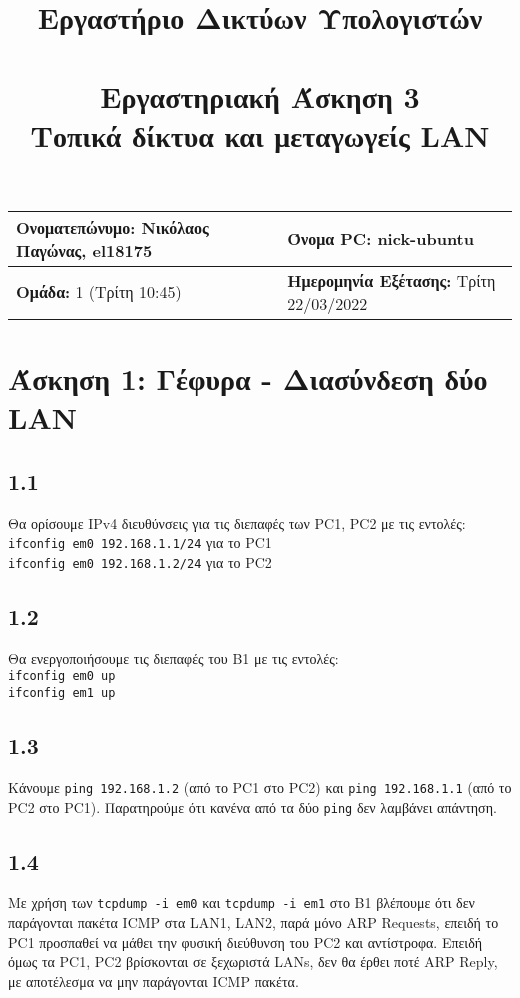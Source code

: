 \documentclass[a4paper, 12pt]{article}
\title{
	\textbf{Εργαστήριο Δικτύων Υπολογιστών} \\~\\
	Εργαστηριακή Άσκηση 3 \\ 
	Τοπικά δίκτυα και μεταγωγείς LAN
}
\author{}
\date{}
\begin{document}
\maketitle
\begin{center}
	\begin{tabular}{|l|l|}
		\hline
		\textbf{Ονοματεπώνυμο:} Νικόλαος Παγώνας, el18175  & \textbf{Όνομα PC:} nick-ubuntu \\
		\hline
		\textbf{Ομάδα:} 1 (Τρίτη 10:45) & \textbf{Ημερομηνία Εξέτασης:} Τρίτη 22/03/2022 \\
		\hline
	\end{tabular}
\end{center}

\section*{Άσκηση 1: Γέφυρα - Διασύνδεση δύο LAN}
	
	\subsection*{1.1}
		Θα ορίσουμε IPv4 διευθύνσεις για τις διεπαφές των PC1, PC2 με τις εντολές: \\
		\verb|ifconfig em0 192.168.1.1/24| για το PC1 \\
		\verb|ifconfig em0 192.168.1.2/24| για το PC2 
	
	\subsection*{1.2}
		Θα ενεργοποιήσουμε τις διεπαφές του Β1 με τις εντολές: \\
		\verb|ifconfig em0 up| \\
		\verb|ifconfig em1 up|
	
	\subsection*{1.3}
		Κάνουμε \verb|ping 192.168.1.2| (από το PC1 στο PC2) και \verb|ping 192.168.1.1| (από το PC2 στο PC1). Παρατηρούμε ότι κανένα από τα δύο \verb|ping| δεν λαμβάνει απάντηση.
	
	\subsection*{1.4}
		Με χρήση των \verb|tcpdump -i em0| και \verb|tcpdump -i em1| στο B1 βλέπουμε ότι δεν παράγονται πακέτα ICMP στα LAN1, LAN2, παρά μόνο ARP Requests, επειδή το PC1 προσπαθεί να μάθει την φυσική διεύθυνση του PC2 και αντίστροφα. Επειδή όμως τα PC1, PC2 βρίσκονται σε ξεχωριστά LANs, δεν θα έρθει ποτέ ARP Reply, με αποτέλεσμα να μην παράγονται ICMP πακέτα.
	
\end{document}
